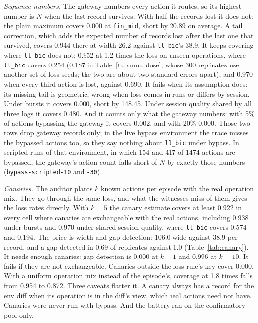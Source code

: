 \documentclass[11pt]{article}
\begin{document}
\emph{Sequence numbers.} The gateway numbers every action it routes, so its highest
number is $N$ when the last record survives. With half the records lost it does
not: the plain maximum covers 0.000 at \texttt{fin\_mid}, short by 20.89 on average.
A tail correction, which adds the expected number of records lost after the last one
that survived, covers 0.944 there at width 26.2 against \texttt{ll\_bic}'s 38.9.
It keeps covering where \texttt{ll\_bic} does not: 0.952 at 1.2 times the loss on
unseen operations, where \texttt{ll\_bic} covers 0.254 (0.187 in
Table~\ref{tab:mnardose}, whose 300 replicates use another set of loss seeds; the
two are about two standard errors apart), and 0.970 when every third action is
lost, against 0.690. It fails when its assumption does: its missing tail is
geometric, wrong when loss comes in runs or differs by session. Under bursts it
covers 0.000, short by 148.45. Under session quality
shared by all three logs it covers 0.480. And it counts only what the gateway
numbers: with 5\% of actions bypassing the gateway it covers 0.002, and with 20\%
0.000. Those two rows drop gateway records only; in the live bypass environment the
trace misses the bypassed actions too, so they say nothing about \texttt{ll\_bic}
under bypass. In scripted runs of that environment, in which 154 and 417 of 1474
actions are bypassed, the gateway's action count falls short of $N$ by exactly
those numbers (\texttt{bypass-scripted-10} and \texttt{-30}).

\emph{Canaries.} The auditor plants $k$ known actions per episode with the real
operation mix. They go through the same loss, and what the witnesses miss of them
gives the loss rates directly. With $k = 5$ the canary estimate covers at least
0.922 in every cell where canaries are exchangeable with the real actions, including
0.938 under bursts and 0.970 under shared session quality, where \texttt{ll\_bic}
covers 0.574 and 0.194. The price is width and gap detection: 106.0 wide against
38.9 per-record, and a gap detected in 0.69 of replicates against 1.0
(Table~\ref{tab:canary}). It needs enough canaries: gap detection is 0.000 at
$k = 1$ and 0.996 at $k = 10$. It fails if they are not exchangeable. Canaries
outside the loss rule's key cover 0.000. With a uniform operation mix instead of the
episode's, coverage at 1.8 times falls from 0.954 to 0.872. Three caveats flatter
it. A canary always has a record for the env diff when its operation is in the
diff's view, which real actions need not have. Canaries were never run with bypass.
And the battery ran on the confirmatory pool only.
\end{document}

